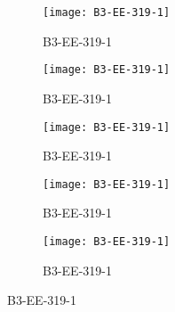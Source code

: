\documentclass{article}
\begin{document}
\begin{figure}[]
	\centering
	\begin{subfigure}{0.19\textwidth}
		\centering
		\texttt{[image: B3-EE-319-1]}
		\caption*{\Large{B3-EE-319-1}}
	\end{subfigure}\hfil
	\begin{subfigure}{0.19\textwidth}
		\centering
		\texttt{[image: B3-EE-319-1]}
		\caption*{\Large{B3-EE-319-1}}
	\end{subfigure}\hfil
	\begin{subfigure}{0.19\textwidth}
		\centering
		\texttt{[image: B3-EE-319-1]}
		\caption*{\Large{B3-EE-319-1}}
	\end{subfigure}\hfil
	\begin{subfigure}{0.19\textwidth}
		\centering
		\texttt{[image: B3-EE-319-1]}
		\caption*{\Large{B3-EE-319-1}}
	\end{subfigure} \hfil
	\begin{subfigure}{0.19\textwidth}
		\centering
		\texttt{[image: B3-EE-319-1]}
		\caption*{\Large{B3-EE-319-1}}
	\end{subfigure}
\end{figure}

 
\end{document}
